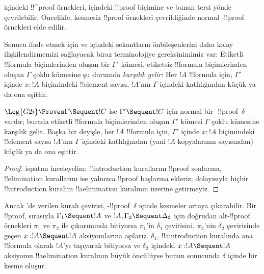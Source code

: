 



 içindeki !!^{proof} örnekleri,  içindeki !!{proof} biçimine
ve bunun tersi yönde çevrilebilir. Öncelikle, kesmesiz 
!!{proof} örnekleri çevrildiğinde normal -!!{proof} örnekleri elde edilir.

Sonucu ifade etmek için  ve  içindeki sekantların
önbileşenlerini daha kolay ilişkilendirmemizi sağlayacak biraz
terminolojiye gereksinimimiz var: Etiketli !!{formula} biçimlerinden oluşan bir
$\Gamma'$ kümesi, etiketsiz !!{formula} biçimlerinden oluşan $\Gamma$ çoklu
kümesine şu durumda \emph{karşılık gelir}: Her $!A$ !!{formula} için,
$\Gamma'$ içinde $x : !A$ biçimindeki !!{element} sayısı, $!A$'nın
$\Gamma$ içindeki katlılığından küçük ya da ona eşittir.

\begin{cor}
$\Log{G2i} \Proves \Gamma \Sequent !C$ ise $\Gamma' \Sequent !C$
için normal bir -!!{proof}~$\delta$ vardır; burada etiketli
!!{formula} biçimlerinden oluşan $\Gamma'$ kümesi $\Gamma$ çoklu kümesine
karşılık gelir. Başka bir deyişle, her $!A$ !!{formula} için,
$\Gamma'$ içinde $x : !A$ biçimindeki !!{element} sayısı $!A$'nın
$\Gamma$ içindeki katlılığından (yani $!A$ kopyalarının sayısından)
küçük ya da ona eşittir.
\end{cor}

\begin{proof}
 ispatını inceleyelim:
!!{introduction} kurallarını !!{proof} sonlarına, !!{elimination}
kurallarını ise yalnızca !!{proof} başlarına ekleriz; dolayısıyla hiçbir
!!{introduction} kuralını !!a{elimination} kuralının üzerine getirmeyiz.
\end{proof}

Ancak 'de verilen \Cut{} kuralı
çevirisi, -!!{proof}~$\delta$ içinde kesmeler ortaya
çıkarabilir. Bir  !!{proof}, sırasıyla $\Gamma_1 \Sequent !A$
ve $!A, \Gamma_2 \Sequent \Delta_2$ için doğrudan alt-!!{proof} örnekleri
$\pi_1$ ve $\pi_2$ ile \Cut{} çıkarımında bitiyorsa $\pi_1$'in
$\delta_1$ çevirisini, $\pi_2$'nin $\delta_2$ çevirisinde geçen $x:!A
\Sequent !A$ aksiyomlarına aşılarız. $\delta_1$, !!a{introduction}
kuralında ana !!{formula} olarak $!A$'yı taşıyarak bitiyorsa ve
$\delta_2$ içindeki $x:!A \Sequent !A$ aksiyomu !!a{elimination}
kuralının büyük öncülüyse bunun sonucunda $\delta$ içinde bir kesme
oluşur.

